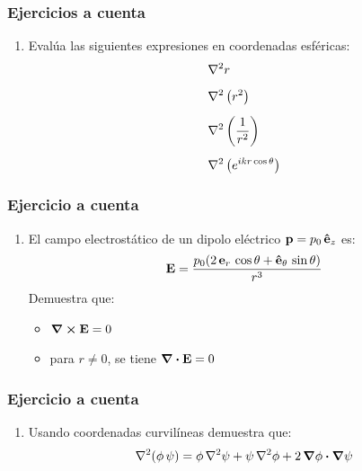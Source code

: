 \documentclass[12pt]{beamer}
\begin{document}
\begin{frame}
\frametitle{Ejercicios a cuenta}
\begin{enumerate}[<+->]
\conti
\item Evalúa las siguientes expresiones en coordenadas esféricas:
\begin{align*}
&\laplacian{r} \\[0.5em]
&\laplacian{\left( r^{2} \right)} \\[0.5em]
&\laplacian{\left( \dfrac{1}{r^{2}} \right)} \\[0.5em]
&\laplacian{\left( e^{i k r \cos \theta} \right)}
\end{align*}
\seti
\end{enumerate}
\end{frame}
\begin{frame}
\frametitle{Ejercicio a cuenta}
\begin{enumerate}
\conti
\item El campo electrostático de un dipolo eléctrico $\vb{p} = p_{0} \, \vu{e}_{z}$ es:
\begin{align*}
\vb{E} = \dfrac{p_{0} (2 \, \vb{e}_{r} \, \cos \theta + \vu{e}_{\theta} \, \sin \theta)}{r^{3}}
\end{align*}
Demuestra que:
\begin{itemize}
\item $\curl{\vb{E}} = 0$
\item para $r \neq 0$, se tiene $\div{\vb{E}} = 0$
\end{itemize}
\seti
\end{enumerate}
\end{frame}
\begin{frame}
\frametitle{Ejercicio a cuenta}
\begin{enumerate}[<+->]
\conti
\item Usando coordenadas curvilíneas demuestra que:
\begin{align*}
\laplacian{(\phi \, \psi)} = \phi \, \laplacian{\psi} + \psi \, \laplacian{\phi} + 2 \, \grad{\phi} \vdot \grad{\psi}
\end{align*}
\end{enumerate}
\end{frame}
\end{document}

